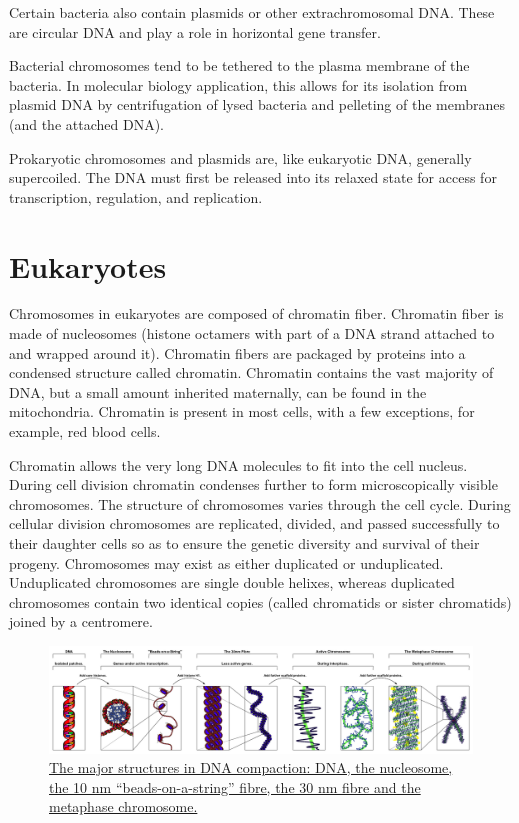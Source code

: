 Certain bacteria also contain plasmids or other extrachromosomal DNA. These are circular DNA and play a role in horizontal gene transfer.

Bacterial chromosomes tend to be tethered to the plasma membrane of the bacteria. In molecular biology application, this allows for its isolation from plasmid DNA by centrifugation of lysed bacteria and pelleting of the membranes (and the attached DNA).

Prokaryotic chromosomes and plasmids are, like eukaryotic DNA, generally supercoiled. The DNA must first be released into its relaxed state for access for transcription, regulation, and replication.

\hypertarget{eukaryotes}{%
\section{Eukaryotes}\label{eukaryotes}}

Chromosomes in eukaryotes are composed of chromatin fiber. Chromatin fiber is made of nucleosomes (histone octamers with part of a DNA strand attached to and wrapped around it). Chromatin fibers are packaged by proteins into a condensed structure called chromatin. Chromatin contains the vast majority of DNA, but a small amount inherited maternally, can be found in the mitochondria. Chromatin is present in most cells, with a few exceptions, for example, red blood cells.

Chromatin allows the very long DNA molecules to fit into the cell nucleus. During cell division chromatin condenses further to form microscopically visible chromosomes. The structure of chromosomes varies through the cell cycle. During cellular division chromosomes are replicated, divided, and passed successfully to their daughter cells so as to ensure the genetic diversity and survival of their progeny. Chromosomes may exist as either duplicated or unduplicated. Unduplicated chromosomes are single double helixes, whereas duplicated chromosomes contain two identical copies (called chromatids or sister chromatids) joined by a centromere.



\begin{figure}

{\centering \includegraphics[width=0.7\linewidth]{./figures/chromosomes/Chromatin_Structures} 

}

\caption{\href{https://commons.wikimedia.org/wiki/File:Chromatin_Structures.png}{The major structures in DNA compaction: DNA, the nucleosome, the 10 nm ``beads-on-a-string'' fibre, the 30 nm fibre and the metaphase chromosome.}}\label{fig:structure}
\end{figure}

